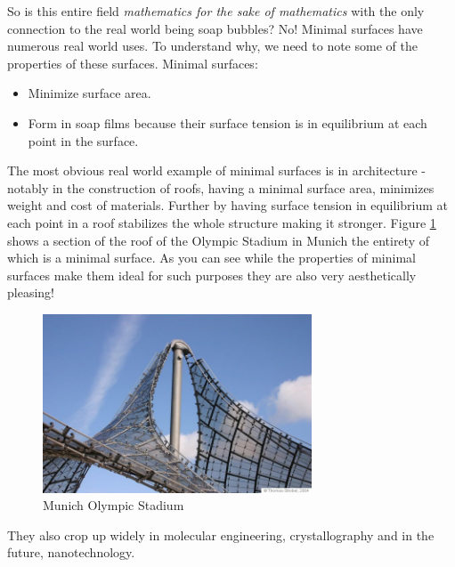 So is this entire field \emph {mathematics for the sake of mathematics} with the only connection to the real world being soap bubbles? No! Minimal surfaces have numerous real world uses. To understand why, we need to note some of the properties of these surfaces. Minimal surfaces: 
\begin{itemize}
	\item Minimize surface area.
	\item Form in soap films because their surface tension is in equilibrium at each point in the surface.
\end{itemize}

The most obvious real world example of minimal surfaces is in architecture - notably in the construction of roofs, having a minimal surface area, minimizes weight and cost of materials. Further by having surface tension in equilibrium at each point in a roof stabilizes the whole structure making it stronger. Figure \ref{fig:munich} shows a section of the roof of the Olympic Stadium in Munich the entirety of which is a minimal surface. As you can see while the properties of minimal surfaces make them ideal for such purposes they are also very aesthetically pleasing!

\begin{figure}[htbp]
	\centering
       \includegraphics[width=8cm]{Images/Munich.eps}
   \caption{Munich Olympic Stadium \cite{MUN}}
   \label{fig:munich}
\end{figure} 


They also crop up widely in molecular engineering, crystallography and in the future, nanotechnology.